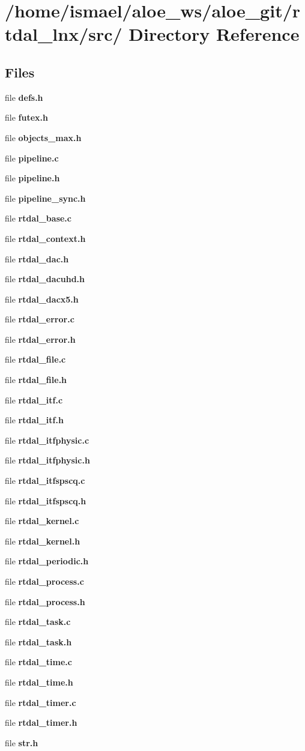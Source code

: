 \section{/home/ismael/aloe\-\_\-ws/aloe\-\_\-git/rtdal\-\_\-lnx/src/ Directory Reference}
\label{dir_695e0429bdbacdf92e478343d85c6976}
\subsection*{Files}
\begin{DoxyCompactItemize}
\item 
file {\bf defs.\-h}
\item 
file {\bf futex.\-h}
\item 
file {\bf objects\-\_\-max.\-h}
\item 
file {\bf pipeline.\-c}
\item 
file {\bf pipeline.\-h}
\item 
file {\bf pipeline\-\_\-sync.\-h}
\item 
file {\bf rtdal\-\_\-base.\-c}
\item 
file {\bf rtdal\-\_\-context.\-h}
\item 
file {\bf rtdal\-\_\-dac.\-h}
\item 
file {\bf rtdal\-\_\-dacuhd.\-h}
\item 
file {\bf rtdal\-\_\-dacx5.\-h}
\item 
file {\bf rtdal\-\_\-error.\-c}
\item 
file {\bf rtdal\-\_\-error.\-h}
\item 
file {\bf rtdal\-\_\-file.\-c}
\item 
file {\bf rtdal\-\_\-file.\-h}
\item 
file {\bf rtdal\-\_\-itf.\-c}
\item 
file {\bf rtdal\-\_\-itf.\-h}
\item 
file {\bf rtdal\-\_\-itfphysic.\-c}
\item 
file {\bf rtdal\-\_\-itfphysic.\-h}
\item 
file {\bf rtdal\-\_\-itfspscq.\-c}
\item 
file {\bf rtdal\-\_\-itfspscq.\-h}
\item 
file {\bf rtdal\-\_\-kernel.\-c}
\item 
file {\bf rtdal\-\_\-kernel.\-h}
\item 
file {\bf rtdal\-\_\-periodic.\-h}
\item 
file {\bf rtdal\-\_\-process.\-c}
\item 
file {\bf rtdal\-\_\-process.\-h}
\item 
file {\bf rtdal\-\_\-task.\-c}
\item 
file {\bf rtdal\-\_\-task.\-h}
\item 
file {\bf rtdal\-\_\-time.\-c}
\item 
file {\bf rtdal\-\_\-time.\-h}
\item 
file {\bf rtdal\-\_\-timer.\-c}
\item 
file {\bf rtdal\-\_\-timer.\-h}
\item 
file {\bf str.\-h}
\end{DoxyCompactItemize}
